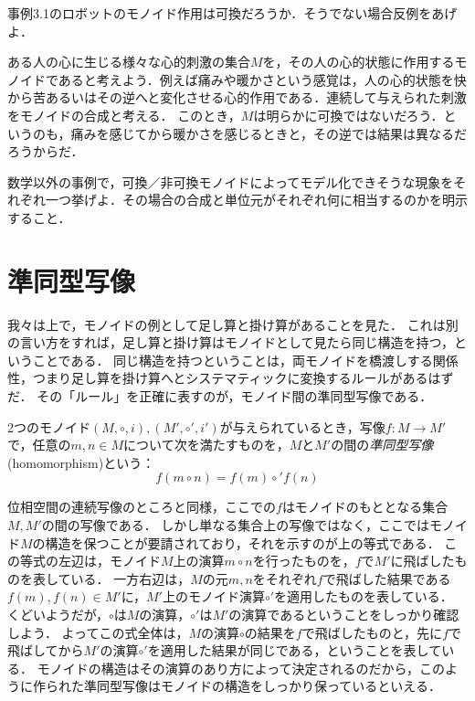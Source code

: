 \documentclass[11pt,a4paper,uplatex]{jsarticle}
\begin{document}
\begin{exercise}
 事例3.1のロボットのモノイド作用は可換だろうか．そうでない場合反例をあげよ．
\end{exercise}


\begin{example}
    ある人の心に生じる様々な心的刺激の集合$M$を，その人の心的状態に作用するモノイドであると考えよう．例えば痛みや暖かさという感覚は，人の心的状態を快から苦あるいはその逆へと変化させる心的作用である．連続して与えられた刺激をモノイドの合成と考える．
    このとき，$M$は明らかに可換ではないだろう．というのも，痛みを感じてから暖かさを感じるときと，その逆では結果は異なるだろうからだ．
\end{example}

\begin{exercise}    数学以外の事例で，可換／非可換モノイドによってモデル化できそうな現象をそれぞれ一つ挙げよ．その場合の合成と単位元がそれぞれ何に相当するのかを明示すること．
\end{exercise}    


\section{準同型写像}
我々は上で，モノイドの例として足し算と掛け算があることを見た．
これは別の言い方をすれば，足し算と掛け算はモノイドとして見たら同じ構造を持つ，ということである．
同じ構造を持つということは，両モノイドを橋渡しする関係性，つまり足し算を掛け算へとシステマティックに変換するルールがあるはずだ．
その「ルール」を正確に表すのが，モノイド間の準同型写像である．

\begin{dfn}[準同型]
    2つのモノイド$(M, \circ, i), (M', \circ', i')$が与えられているとき，写像$f:M \to M'$で，任意の$m,n \in M$について次を満たすものを，$M$と$M'$の間の\emph{準同型写像}(homomorphism)という：
    \[f(m \circ n) = f(m) \circ' f(n)\]
\end{dfn}

位相空間の連続写像のところと同様，ここでの$f$はモノイドのもととなる集合$M,M'$の間の写像である．
しかし単なる集合上の写像ではなく，ここではモノイド$M$の構造を保つことが要請されており，それを示すのが上の等式である．
この等式の左辺は，モノイド$M$上の演算$m \circ n$を行ったものを，$f$で$M'$に飛ばしたものを表している．
一方右辺は，$M$の元$m,n$をそれぞれ$f$で飛ばした結果である$f(m), f(n) \in M'$に，$M'$上のモノイド演算$\circ'$を適用したものを表している．
くどいようだが，$\circ$は$M$の演算，$\circ'$は$M'$の演算であるということをしっかり確認しよう．
よってこの式全体は，$M$の演算$\circ$の結果を$f$で飛ばしたものと，先に$f$で飛ばしてから$M'$の演算$\circ'$を適用した結果が同じである，ということを表している．
モノイドの構造はその演算のあり方によって決定されるのだから，このように作られた準同型写像はモノイドの構造をしっかり保っているといえる．
\end{document}
